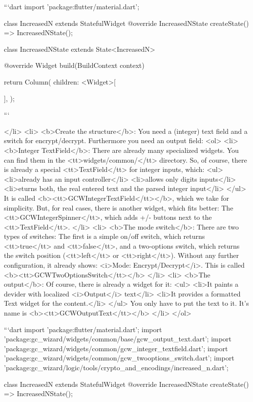 ```dart
import 'package:flutter/material.dart';

class IncreasedN extends StatefulWidget {
  @override
  IncreasedNState createState() => IncreasedNState();
}

class IncreasedNState extends State<IncreasedN> {

  @override
  Widget build(BuildContext context) {
  return Column(
    children: <Widget>[

    ],
  );
  }
}
```
    
</li>
	<li>
		<b>Create the structure</b>: You need a (integer) text field and a switch for encrypt/decrypt. Furthermore you need an output field:
		<ol>
      <li>
				<b>Integer TextField</b>: There are already many specialized widgets. You can find them in the <tt>widgets/common/</tt> directory. So, of course, there is already a special <tt>TextField</tt> for integer inputs, which:
				<ul>
					<li>already has an input controller</li>
					<li>allows only digits inputs</li>
					<li>eturns both, the real entered text and the parsed integer input</li>
				</ul>  
				It is called <b><tt>GCWIntegerTextField</tt></b>, which we take for simplicity. But, for real cases, there is another widget, which fits better: The <tt>GCWIntegerSpinner</tt>, which adds +/- buttons next to the <tt>TextField</tt>.
			</li>  
      <li>
				<b>The mode switch</b>: There are two types of switches: The first is a simple on/off switch, which returns <tt>true</tt> and <tt>false</tt>, and a two-options switch, which returns the switch position (<tt>left</tt> or <tt>right</tt>). Without any further configuration, it already shows: <i>Mode: Encrypt/Decrypt</i>. This is called <b><tt>GCWTwoOptionsSwitch</tt></b>
			</li>
			<li>
				<b>The output</b>: Of course, there is already a widget for it:
				<ul>
					<li>It paints a devider with localized <i>Output</i> text</li>
					<li>It provides a formatted Text widget for the content.</li>
				</ul>
				You only have to put the text to it. It's name is <b><tt>GCWOutputText</tt></b> 
			</li>    
</ol>


```dart
import 'package:flutter/material.dart';
import 'package:gc_wizard/widgets/common/base/gcw_output_text.dart';
import 'package:gc_wizard/widgets/common/gcw_integer_textfield.dart';
import 'package:gc_wizard/widgets/common/gcw_twooptions_switch.dart';
import 'package:gc_wizard/logic/tools/crypto_and_encodings/increased_n.dart';

class IncreasedN extends StatefulWidget {
  @override
  IncreasedNState createState() => IncreasedNState();
}

